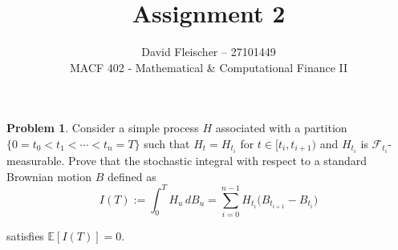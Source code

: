 \documentclass[12pt]{article}
\begin{document}
 
 
\title{Assignment 2}
\author{David Fleischer -- 27101449\\ 
MACF 402 - Mathematical \& Computational Finance II}
 
\maketitle

{\bf Problem 1}. Consider a simple process $H$ associated with a partition $\{0 = t_0 < t_1 < \cdots < t_n = T \}$ such that $H_t = H_{t_i}$ for $t \in [t_i, t_{i+1})$ and $H_{t_i}$ is $\mathcal F_{t_i}$-measurable. Prove that the stochastic integral with respect to a standard Brownian motion $B$ defined as
\begin{equation*}
	I(T) := \int^T_0 H_u\,dB_u = \sum^{n-1}_{i = 0}H_{t_i}\big(B_{t_{i+1}} - B_{t_i} \big)
\end{equation*}

satisfies $\mathbb E[I(T)] = 0$. \\
\end{document}
